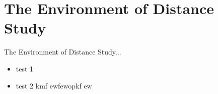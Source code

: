 \section{The Environment of Distance Study}
\label{The Environment of Distance Study}
The Environment of Distance Study...
\begin{itemize}
	\item test 1
	\item test 2 kmf ewfewopkf ew
\end{itemize}
